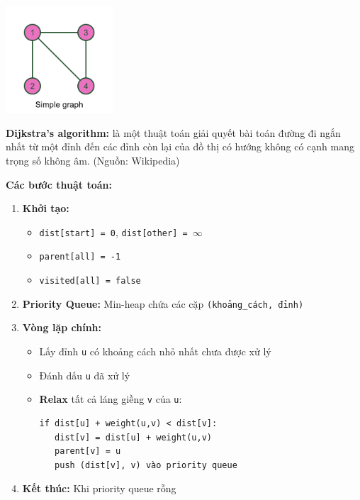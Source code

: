 \documentclass[12pt,a4paper]{article}
\begin{document}
{\centering
    \includegraphics[width=0.3\textwidth]{assets/image/simple-graph.png}
\par}
\vspace{1cm}

\textbf{Dijkstra's algorithm:} là một thuật toán giải quyết bài toán đường đi ngắn nhất từ một đỉnh đến các đỉnh còn lại của đồ thị có hướng không có cạnh mang trọng số không âm. (Nguồn: Wikipedia)

\newpage

\textbf{Các bước thuật toán:}

\begin{enumerate}
   \item \textbf{Khởi tạo:}
   \begin{itemize}[label=\textbullet]
       \item \texttt{dist[start] = 0}, \texttt{dist[other] = $\infty$}
       \item \texttt{parent[all] = -1}
       \item \texttt{visited[all] = false}
   \end{itemize}

   \item \textbf{Priority Queue:} Min-heap chứa các cặp \texttt{(khoảng\_cách, đỉnh)}

   \item \textbf{Vòng lặp chính:}
   \begin{itemize}[label=\textbullet]
       \item Lấy đỉnh \texttt{u} có khoảng cách nhỏ nhất chưa được xử lý
       \item Đánh dấu \texttt{u} đã xử lý
       \item \textbf{Relax} tất cả láng giềng \texttt{v} của \texttt{u}:
       \begin{verbatim}
if dist[u] + weight(u,v) < dist[v]:
   dist[v] = dist[u] + weight(u,v)
   parent[v] = u
   push (dist[v], v) vào priority queue
       \end{verbatim}
   \end{itemize}

   \item \textbf{Kết thúc:} Khi priority queue rỗng
\end{enumerate}
\end{document}
